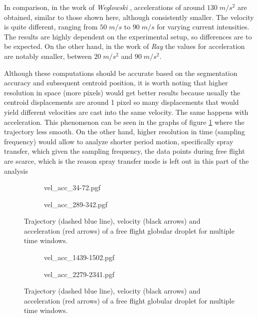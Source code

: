 In comparison, in the work of \textit{Weglowski} \cite{vel}, accelerations of around $130 \;m/s^2$ are obtained, similar to those shown here, although consistently smaller. The velocity is quite different, ranging from $50\;m/s$ to $90\;m/s$ for varying current intensities. The results are highly dependent on the experimental setup, so differences are to be expected. On the other hand, in the work of \textit{Ray} \cite{Ray} the values for acceleration are notably smaller, between $20\;m/s^2$ and $90\;m/s^2$.

Although these computations should be accurate based on the segmentation accuracy and subsequent centroid position, it is worth noting that higher resolution in space (more pixels) would get better results because usually the centroid displacements are around 1 pixel so many displacements that would yield different velocities are cast into the same velocity. The same happens with acceleration. This phenomenon can be seen in the graphs of figure \ref{fig:vel} where the trajectory less smooth. On the other hand, higher resolution in time (sampling frequency) would allow to analyze shorter period motion, specifically spray transfer, which given the sampling frequency, the data points during free flight are scarce, which is the reason spray transfer mode is left out in this part of the analysis
\begin{figure}
\centering
  \begin{subfigure}[b]{\textwidth}
    {vel_acc_34-72.pgf}
  \end{subfigure}
\vfill
  \begin{subfigure}[b]{\textwidth}
    {vel_acc_289-342.pgf}
  \end{subfigure}
\caption[Trajectory, velocity and acceleration of a free flight globular droplet for multiple time windows]{Trajectory (dashed blue line), velocity (black arrows) and acceleration (red arrows) of a free flight globular droplet for multiple time windows.} 
\label{fig:vel}
\end{figure}

\begin{figure}
\centering
    \ContinuedFloat
    \captionsetup{list=off,format=cont}
  \begin{subfigure}[b]{\textwidth}
    {vel_acc_1439-1502.pgf}
  \end{subfigure}
\vfill
  \begin{subfigure}[b]{\textwidth}
    {vel_acc_2279-2341.pgf}
  \end{subfigure}
\caption{Trajectory (dashed blue line), velocity (black arrows) and acceleration (red arrows) of a free flight globular droplet for multiple time windows.} 
\end{figure}



